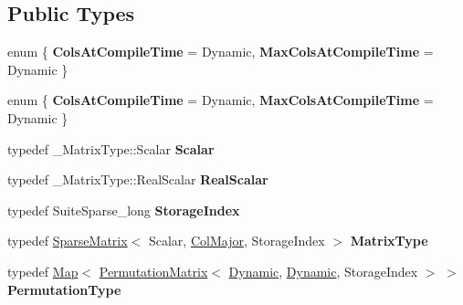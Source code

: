 \subsection*{Public Types}
\begin{DoxyCompactItemize}
\item 
\mbox{\label{class_eigen_1_1_s_p_q_r_a517c1e7cb2f6b7ea460da18c04d00203}} 
enum \{ {\bfseries Cols\+At\+Compile\+Time} = Dynamic, 
{\bfseries Max\+Cols\+At\+Compile\+Time} = Dynamic
 \}
\item 
\mbox{\label{class_eigen_1_1_s_p_q_r_a0f79be9911c2b1d8fad5875ae980953e}} 
enum \{ {\bfseries Cols\+At\+Compile\+Time} = Dynamic, 
{\bfseries Max\+Cols\+At\+Compile\+Time} = Dynamic
 \}
\item 
\mbox{\label{class_eigen_1_1_s_p_q_r_a79aab4f4c7b3560c35ff3964e2831168}} 
typedef \+\_\+\+Matrix\+Type\+::\+Scalar {\bfseries Scalar}
\item 
\mbox{\label{class_eigen_1_1_s_p_q_r_aa0433fd3ee69389de7546a1daf40db04}} 
typedef \+\_\+\+Matrix\+Type\+::\+Real\+Scalar {\bfseries Real\+Scalar}
\item 
\mbox{\label{class_eigen_1_1_s_p_q_r_a7154a96ee31df16cc511f275a5b02d27}} 
typedef Suite\+Sparse\+\_\+long {\bfseries Storage\+Index}
\item 
\mbox{\label{class_eigen_1_1_s_p_q_r_ab91804223761e179d79bd3a1aa7c4111}} 
typedef \hyperlink{group___sparse_core___module_class_eigen_1_1_sparse_matrix}{Sparse\+Matrix}$<$ Scalar, \hyperlink{group__enums_ggaacded1a18ae58b0f554751f6cdf9eb13a0cbd4bdd0abcfc0224c5fcb5e4f6669a}{Col\+Major}, Storage\+Index $>$ {\bfseries Matrix\+Type}
\item 
\mbox{\label{class_eigen_1_1_s_p_q_r_aa74de4635fdaee8773d8b320b564db5f}} 
typedef \hyperlink{group___core___module_class_eigen_1_1_map}{Map}$<$ \hyperlink{group___core___module_class_eigen_1_1_permutation_matrix}{Permutation\+Matrix}$<$ \hyperlink{namespace_eigen_ad81fa7195215a0ce30017dfac309f0b2}{Dynamic}, \hyperlink{namespace_eigen_ad81fa7195215a0ce30017dfac309f0b2}{Dynamic}, Storage\+Index $>$ $>$ {\bfseries Permutation\+Type}

\end{DoxyCompactItemize}
